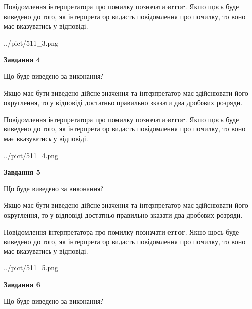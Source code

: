\documentclass[12pt, ukrainian]{article}
\begin{document}
{\begin {Large}
Повідомлення інтерпретатора про помилку позначати \textbf{error}.
Якщо щось буде виведено до того, як інтерпретатор видасть повідомлення про помилку, 
то воно має вказуватись у відповіді. \par

\begin{center}
	{../pict/511_3.png}
\end{center}
\newpage

{\begin {center}\textbf{Завдання 4}\end {center}}\par
Що буде виведено за виконання? \par

Якщо має бути виведено дійсне значення та інтерпретатор має здійснювати його округлення, 
то у відповіді достатньо правильно вказати два дробових розряди.

Повідомлення інтерпретатора про помилку позначати \textbf{error}.
Якщо щось буде виведено до того, як інтерпретатор видасть повідомлення про помилку, 
то воно має вказуватись у відповіді. \par

\begin{center}
	{../pict/511_4.png}
\end{center}
\newpage

{\begin {center}\textbf{Завдання 5}\end {center}}\par
Що буде виведено за виконання? \par

Якщо має бути виведено дійсне значення та інтерпретатор має здійснювати його округлення, 
то у відповіді достатньо правильно вказати два дробових розряди.

Повідомлення інтерпретатора про помилку позначати \textbf{error}.
Якщо щось буде виведено до того, як інтерпретатор видасть повідомлення про помилку, 
то воно має вказуватись у відповіді. \par

\begin{center}
	{../pict/511_5.png}
\end{center}
\newpage

{\begin {center}\textbf{Завдання 6}\end {center}}\par
Що буде виведено за виконання? \par


\end{Large}}
\end{document}
